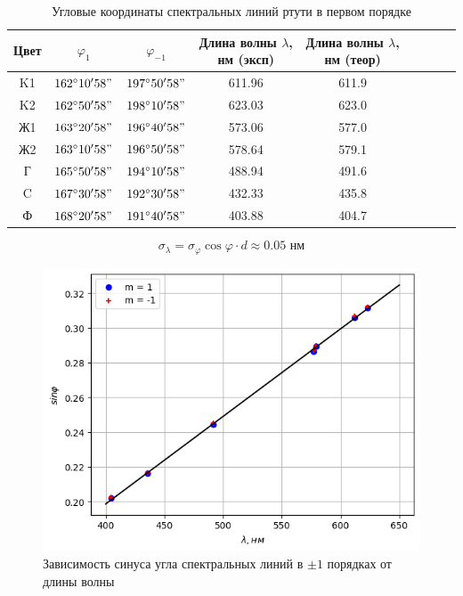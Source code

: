 \begin{table}[h!]
    \centering
    \begin{tabular}{|c|c|c|c|c|c|c|c|c|}
        \hline
        Цвет & $\varphi_{1}$ & $\varphi_{-1}$ & Длина волны $\lambda$, нм (эксп) & Длина волны $\lambda$, нм (теор) \\\hline
        K1   & $162^{\circ}10'58"$ & $197^{\circ}50'58"$ & 611.96 & 611.9 \\\hline
        K2   & $162^{\circ}50'58"$ & $198^{\circ}10'58"$ & 623.03 & 623.0 \\\hline
        Ж1   & $163^{\circ}20'58"$ & $196^{\circ}40'58"$ & 573.06 & 577.0 \\\hline
        Ж2   & $163^{\circ}10'58"$ & $196^{\circ}50'58"$ & 578.64 & 579.1 \\\hline
        Г    & $165^{\circ}50'58"$ & $194^{\circ}10'58"$ & 488.94 & 491.6 \\\hline
        C    & $167^{\circ}30'58"$ & $192^{\circ}30'58"$ & 432.33 & 435.8 \\\hline
        Ф    & $168^{\circ}20'58"$ & $191^{\circ}40'58"$ & 403.88 & 404.7 \\\hline
    \end{tabular}
    \caption{Угловые координаты спектральных линий ртути в первом порядке}
\end{table}

$$\sigma_{\lambda} = \sigma_{\varphi} \cos\varphi \cdot d \approx 0.05 \text{ нм}$$

\newpage
\begin{figure}[h!]
    \centering
    \includegraphics[width=12cm]{images/plot1.png}
    \caption{Зависимость синуса угла спектральных линий в $\pm 1$ порядках от длины волны} \label{fig:plt1}
\end{figure}

